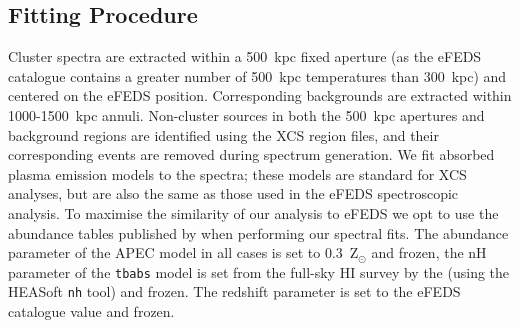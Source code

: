 \documentclass[fleqn,usenatbib]{mnras}
\begin{document}
\subsection{Fitting Procedure}
\label{subsec:fitproc}

Cluster spectra are extracted within a 500~kpc fixed aperture (as the eFEDS catalogue contains a greater number of 500~kpc temperatures than 300~kpc) and centered on the eFEDS position.  Corresponding backgrounds are extracted within 1000-1500~kpc annuli. Non-cluster sources in both the 500~kpc apertures and background regions are identified using the XCS region files, and their corresponding events are removed during spectrum generation.  We fit absorbed \cite[with \texttt{tbabs}, ][]{tbabs} plasma emission models \citep[APEC, ][]{apec} to the spectra; these models are standard for XCS analyses, but are also the same as those used in the eFEDS spectroscopic analysis. To maximise the similarity of our analysis to eFEDS we opt to use the abundance tables published by \cite{aspl} when performing our spectral fits. The abundance parameter of the APEC model in all cases is set to 0.3~Z$_{\odot}$ and frozen, the nH parameter of the \texttt{tbabs} model is set from the full-sky HI survey by the \cite{nh} (using the HEASoft \texttt{nh} tool) and frozen. The redshift parameter is set to the eFEDS catalogue value and frozen.



\end{document}
